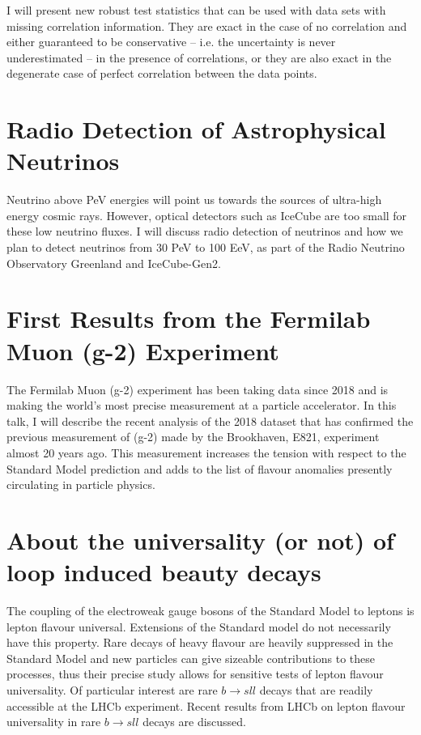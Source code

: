 \documentclass[12pt, a4paper, notitlepage, onecolumn]{article}
\begin{document}
I will present new robust test statistics that can be used with data sets with missing correlation information.  They are exact in the case of no correlation and either guaranteed to be conservative -- i.e. the uncertainty is never underestimated -- in the presence of correlations, or they are also exact in the degenerate case of perfect correlation between the data points.

\section{Radio Detection of Astrophysical Neutrinos}
\noindent Neutrino above PeV energies will point us towards the sources of ultra-high energy cosmic rays. However, optical detectors such as IceCube are too small for these low neutrino fluxes. I will discuss radio detection of neutrinos and how we plan to detect neutrinos from 30 PeV to 100 EeV, as part of the Radio Neutrino Observatory Greenland and IceCube-Gen2.

\section{First Results from the Fermilab Muon (g-2) Experiment}
\noindent The Fermilab Muon (g-2) experiment has been taking data since 2018 and is making the world’s most precise measurement at a particle accelerator. In this talk, I will describe the recent analysis of the 2018 dataset that has confirmed the previous measurement of (g-2) made by the Brookhaven, E821, experiment almost 20 years ago. This measurement increases the tension with respect to the Standard Model prediction and adds to the list of flavour anomalies presently circulating in particle physics.

\section{About the universality (or not) of loop induced beauty decays}
\noindent The coupling of the electroweak gauge bosons of the Standard Model to leptons is lepton flavour universal. Extensions of the Standard model do not necessarily have this property. Rare decays of heavy flavour are heavily suppressed in the Standard Model and new particles can give sizeable contributions to these processes, thus their precise study allows for sensitive tests of lepton flavour universality. Of particular interest are rare $b\to sll$ decays that are readily accessible at the LHCb experiment. Recent results from LHCb on lepton flavour universality in rare $b\to sll$ decays are discussed.
\end{document}
